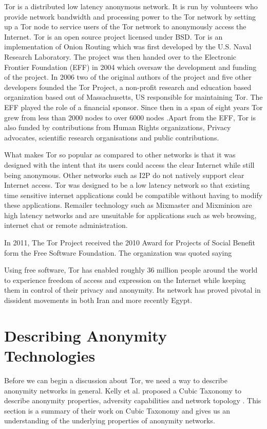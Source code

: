 \documentclass{llncs}
\begin{document}
Tor is a distributed low latency anonymous network. It is run by volunteers who provide network bandwidth and processing power to the Tor network by setting up a Tor node to service users of the Tor network to anonymously access the Internet. Tor is an open source project licensed under BSD. Tor is an implementation of Onion Routing which was first developed by the U.S. Naval Research Laboratory. The project was then handed over to the Electronic Frontier Foundation (EFF) in 2004 which oversaw the development and funding of the project. In 2006 two of the original authors of the project and five other developers founded the Tor Project, a non-profit research and education based organization based out of Massachusetts, US responsible for maintaining Tor. The EFF played the role of a financial sponsor. Since then in a span of eight years Tor grew from less than 2000 nodes to over 6000 nodes \cite{tor-metrics}.Apart from the EFF, Tor is also funded by contributions from Human Rights organizations, Privacy advocates, scientific research organisations and public contributions.
 
What makes Tor so popular as compared to other networks is that it was designed with the intent that its users could access the clear Internet while still being anonymous. Other networks such as I2P do not natively support clear Internet access. Tor was designed to be a low latency network so that existing time sensitive internet applications could be compatible without having to modify these applications. Remailer technology such as Mixmaster and Mixminion are high latency networks and are unsuitable for applications such as web browsing, internet chat or remote administration.

In 2011, The Tor Project received the 2010 Award for Projects of Social Benefit form the Free Software Foundation. The organization was quoted saying
\begin{displayquote}
Using free software, Tor has enabled roughly 36 million people around the world to experience freedom of access and expression on the Internet while keeping them in control of their privacy and anonymity. Its network has proved pivotal in dissident movements in both Iran and more recently Egypt.\cite{free-software-foundation}
\end{displayquote}

\section{Describing Anonymity Technologies} \label{taxonomy}
Before we can begin a discussion about Tor,  we need a way to describe anonymity networks in general. Kelly et al. proposed a Cubic Taxonomy to describe anonymity properties, adversity capabilities and network topology \cite{kelly2012exploring}. This section is a summary of their work on Cubic Taxonomy and gives us an understanding of the underlying properties of anonymity networks.
\end{document}
